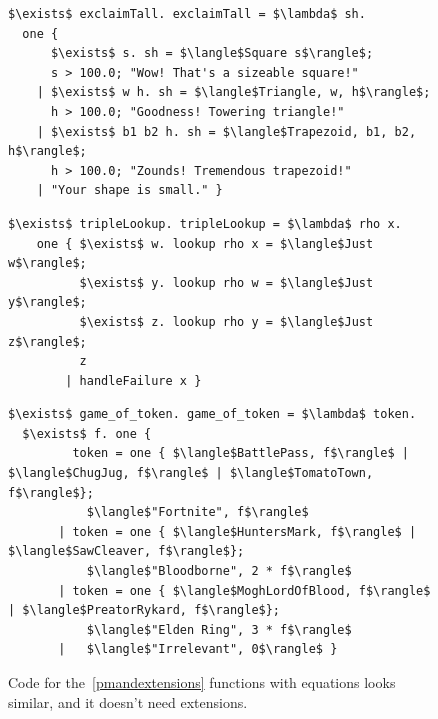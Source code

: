 \documentclass[article,screen,12pt, nonacm]{acmart}
\begin{document}
    \begin{figure}[ht] 
        \begin{minipage}[h]{0.54\linewidth}
          \verselst
          \begin{lstlisting}[numbers=none, basicstyle=\tiny, xleftmargin=.2em,
                            showstringspaces=false,
                            frame=single]
$\exists$ exclaimTall. exclaimTall = $\lambda$ sh. 
  one { 
      $\exists$ s. sh = $\langle$Square s$\rangle$; 
      s > 100.0; "Wow! That's a sizeable square!"
    | $\exists$ w h. sh = $\langle$Triangle, w, h$\rangle$; 
      h > 100.0; "Goodness! Towering triangle!"
    | $\exists$ b1 b2 h. sh = $\langle$Trapezoid, b1, b2, h$\rangle$;
      h > 100.0; "Zounds! Tremendous trapezoid!"
    | "Your shape is small." }
            \end{lstlisting}
            \label{fig:verseexclaimtall} 
        \end{minipage}%
        \begin{minipage}[h]{0.5\linewidth}
          \verselst
          \begin{lstlisting}[numbers=none, basicstyle=\tiny, xleftmargin=2em,
                        frame=single]
$\exists$ tripleLookup. tripleLookup = $\lambda$ rho x. 
    one { $\exists$ w. lookup rho x = $\langle$Just w$\rangle$; 
          $\exists$ y. lookup rho w = $\langle$Just y$\rangle$; 
          $\exists$ z. lookup rho y = $\langle$Just z$\rangle$;
          z
        | handleFailure x }
          \end{lstlisting}
            \label{fig:versetriplelookup} 
        \vspace{4ex}
        \end{minipage} 
        \begin{minipage}[h]{\linewidth}
          \verselst
          \begin{lstlisting}[numbers=none, basicstyle=\tiny, xleftmargin=9em, 
                            frame=single, showstringspaces=false]
$\exists$ game_of_token. game_of_token = $\lambda$ token. 
  $\exists$ f. one {
         token = one { $\langle$BattlePass, f$\rangle$ | $\langle$ChugJug, f$\rangle$ | $\langle$TomatoTown, f$\rangle$}; 
           $\langle$"Fortnite", f$\rangle$
       | token = one { $\langle$HuntersMark, f$\rangle$ | $\langle$SawCleaver, f$\rangle$}; 
           $\langle$"Bloodborne", 2 * f$\rangle$
       | token = one { $\langle$MoghLordOfBlood, f$\rangle$ | $\langle$PreatorRykard, f$\rangle$}; 
           $\langle$"Elden Ring", 3 * f$\rangle$
       |   $\langle$"Irrelevant", 0$\rangle$ }
          \end{lstlisting}
            \label{fig:versegot} 
        \vspace{4ex}
        \end{minipage}%
    \caption{Code for the~\ref{pmandextensions} functions with equations looks
    similar, and it doesn't need extensions.}
    \label{fig:verseextfuncs}
      \end{figure}
\end{document}
